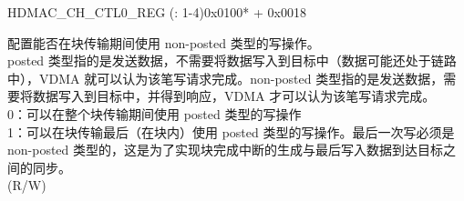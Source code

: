 \addtocounter{Regfloat}{-1}
\begin{register}{H}{DMAC\_CH\_CTL0\_REG (: 1-4)}{0x0100* + 0x0018}
\begin{regdesc}\begin{reglist}
\item [接上页...]
\label{fielddesc:DMACCHNNONPOSTEDLASTWRITEEN}\item [DMAC\_CH\regindex{n}\_NONPOSTED\_LASTWRITE\_EN] 配置能否在块传输期间使用 non-posted 类型的写操作。\\
posted 类型指的是发送数据，不需要将数据写入到目标中（数据可能还处于链路中），VDMA 就可以认为该笔写请求完成。non-posted 类型指的是发送数据，需要将数据写入到目标中，并得到响应，VDMA 才可以认为该笔写请求完成。\\
0：可以在整个块传输期间使用 posted 类型的写操作 \\
1：可以在块传输最后（在块内）使用 posted 类型的写操作。最后一次写必须是 non-posted 类型的，这是为了实现块完成中断的生成与最后写入数据到达目标之间的同步。 \\
(R/W)
\end{reglist}\end{regdesc}
\end{register}


